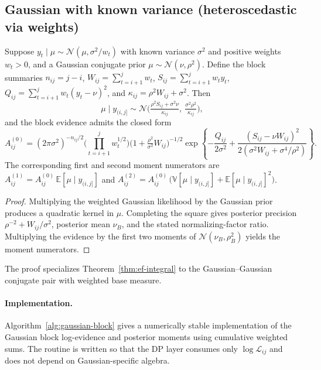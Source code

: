 \subsection{Gaussian with known variance (heteroscedastic via weights)}
\label{sec:family-gaussian}

\begin{proposition}
\label{prop:gaussian-block}
Suppose $y_t\mid \mu \sim \mathcal{N}(\mu,\sigma^2/w_t)$ with known variance $\sigma^2$ and
positive weights $w_t>0$, and a Gaussian conjugate prior $\mu\sim\mathcal{N}(\nu,\rho^2)$. Define
the block summaries
$n_{ij}=j-i$, $W_{ij}=\sum_{t=i+1}^j w_t$, $S_{ij}=\sum_{t=i+1}^j w_t y_t$,
$Q_{ij}=\sum_{t=i+1}^j w_t (y_t-\nu)^2$, and $\kappa_{ij}=\rho^2 W_{ij}+\sigma^2$.
Then
\[
\mu\mid y_{(i,j]} \sim \mathcal{N}\!\Big(
\tfrac{\rho^2 S_{ij} + \sigma^2 \nu}{\kappa_{ij}},
\ \tfrac{\sigma^2\rho^2}{\kappa_{ij}}
\Big),
\]
and the block evidence admits the closed form
\[
A^{(0)}_{ij}
=(2\pi\sigma^2)^{-n_{ij}/2}
\Big(\prod_{t=i+1}^j w_t^{1/2}\Big)
\Big(1+\tfrac{\rho^2}{\sigma^2}W_{ij}\Big)^{-1/2}
\exp\!\left\{-\frac{Q_{ij}}{2\sigma^2}
+\frac{(S_{ij}-\nu W_{ij})^2}{2(\sigma^2 W_{ij}+\sigma^4/\rho^2)}\right\}.
\]
The corresponding first and second moment numerators are
$A^{(1)}_{ij}=A^{(0)}_{ij}\,\mathbb{E}[\mu\mid y_{(i,j]}]$ and
$A^{(2)}_{ij}=A^{(0)}_{ij}\,\big(\mathbb{V}[\mu\mid y_{(i,j]}]+\mathbb{E}[\mu\mid y_{(i,j]}]^2\big)$.
\end{proposition}
\begin{proof}
Multiplying the weighted Gaussian likelihood by the Gaussian prior produces a quadratic kernel in
$\mu$. Completing the square gives posterior precision $\rho^{-2}+W_{ij}/\sigma^2$, posterior mean
$\nu_B$, and the stated normalizing-factor ratio. Multiplying the evidence by the first two moments
of $\mathcal N(\nu_B,\rho_B^2)$ yields the moment numerators.
\end{proof}

The proof specializes Theorem~\ref{thm:ef-integral} to the Gaussian--Gaussian conjugate pair with weighted base measure.

\paragraph{Implementation.}
Algorithm~\ref{alg:gaussian-block} gives a numerically stable implementation of the Gaussian block log-evidence and posterior moments using cumulative weighted sums.
The routine is written so that the DP layer consumes only $\log \mathcal{L}_{ij}$ and does not depend on Gaussian-specific algebra.

